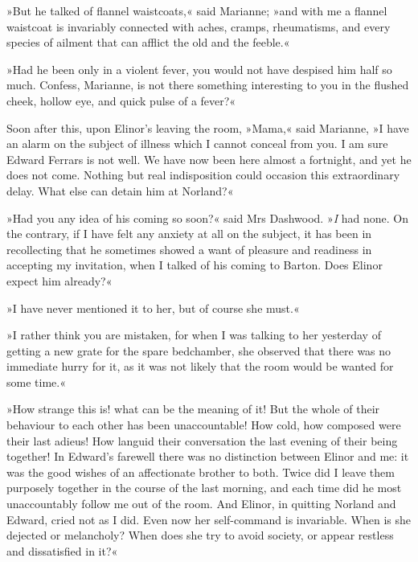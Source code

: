 »But he talked of flannel waistcoats,« said Marianne; »and with me a flannel waistcoat is invariably connected with aches, cramps, rheumatisms, and every species of ailment that can afflict the old and the feeble.«

»Had he been only in a violent fever, you would not have despised him half so much. Confess, Marianne, is not there something interesting to you in the flushed cheek, hollow eye, and quick pulse of a fever?«

Soon after this, upon Elinor’s leaving the room, »Mama,« said Marianne, »I have an alarm on the subject of illness which I cannot conceal from you. I am sure Edward Ferrars is not well. We have now been here almost a fortnight, and yet he does not come. Nothing but real indisposition could occasion this extraordinary delay. What else can detain him at Norland?«

»Had you any idea of his coming so soon?« said Mrs Dashwood. »\textit{I} had none. On the contrary, if I have felt any anxiety at all on the subject, it has been in recollecting that he sometimes showed a want of pleasure and readiness in accepting my invitation, when I talked of his coming to Barton. Does Elinor expect him already?«

»I have never mentioned it to her, but of course she must.«

»I rather think you are mistaken, for when I was talking to her yesterday of getting a new grate for the spare bedchamber, she observed that there was no immediate hurry for it, as it was not likely that the room would be wanted for some time.«

»How strange this is! what can be the meaning of it! But the whole of their behaviour to each other has been unaccountable! How cold, how composed were their last adieus! How languid their conversation the last evening of their being together! In Edward’s farewell there was no distinction between Elinor and me: it was the good wishes of an affectionate brother to both. Twice did I leave them purposely together in the course of the last morning, and each time did he most unaccountably follow me out of the room. And Elinor, in quitting Norland and Edward, cried not as I did. Even now her self-command is invariable. When is she dejected or melancholy? When does she try to avoid society, or appear restless and dissatisfied in it?«